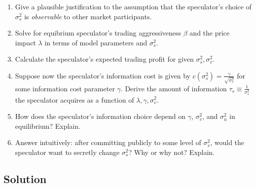 \documentclass[a4paper]{article}
\newif\ifsolutions
\begin{document}
\begin{enumerate}
	\item Give a plausible justification to the assumption that the speculator's choice of $\sigma^2_s$ is \emph{observable} to other market participants.
	
	
	
	\item Solve for equibrium speculator's trading aggressiveness $\beta$ and the price impact $\lambda$ in terms of model parameters and $\sigma^2_s$.
	
	\item Calculate the speculator's expected trading profit for given $\sigma^2_s, \sigma^2_v$.
	
	\item Suppose now the speculator's information cost is given by $c(\sigma^2_s) = \frac{\gamma}{\sqrt{\sigma^2_s}}$ for some information cost parameter $\gamma$. Derive the amount of information $\tau_s \equiv \frac{1}{\sigma^2_s}$ the speculator acquires as a function of $\lambda, \gamma, \sigma^2_v$. 
	
	\item How does the speculator's information choice depend on $\gamma$, $\sigma_v^2$, and $\sigma^2_u$ in equilibrium? Explain.
	
	\item Answer intuitively: after committing publicly to some level of $\sigma^2_s$, would the speculator want to secretly change $\sigma^2_s$? Why or why not? Explain.
\end{enumerate}


\ifsolutions
\subsection*{Solution}
\end{document}
